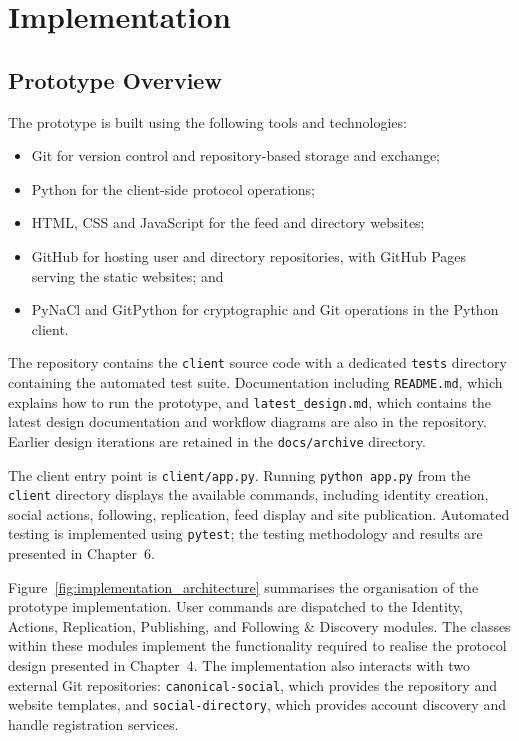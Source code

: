 \section{Implementation}\label{sec:implementation}


\subsection{Prototype Overview}
The prototype is built using the following tools and technologies:
\begin{itemize}
    \item Git for version control and repository-based storage and exchange;
    \item Python for the client-side protocol operations;
    \item HTML, CSS and JavaScript for the feed and directory websites;
    \item GitHub for hosting user and directory repositories, with
    GitHub Pages serving the static websites; and
    \item PyNaCl and GitPython for cryptographic and Git operations
    in the Python client.
\end{itemize}

The repository contains the \texttt{client} source code with a dedicated \texttt{tests} directory containing the automated test suite. Documentation including \texttt{README.md}, which explains how to run the prototype, and \texttt{latest\_design.md}, which contains the latest design documentation and workflow diagrams are also in the repository. Earlier design iterations are retained in the \texttt{docs/archive} directory. 

The client entry point is \texttt{client/app.py}. Running \texttt{python app.py} from the \texttt{client} directory displays the available commands, including identity creation, social actions, following, replication, feed display and site publication. Automated testing is implemented using \texttt{pytest}; the testing methodology and results are presented in Chapter~6.

Figure~\ref{fig:implementation_architecture} summarises the organisation of the prototype implementation. User commands are dispatched to the Identity, Actions, Replication, Publishing, and Following \& Discovery modules. The classes within these modules implement the functionality required to realise the protocol design presented in Chapter~4. The implementation also interacts with two external Git repositories: \texttt{canonical-social}, which provides the repository and website templates, and \texttt{social-directory}, which provides account discovery and handle registration services.

